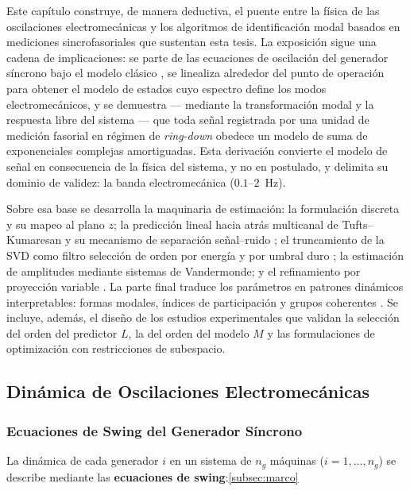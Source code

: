 Este capítulo construye, de manera deductiva, el puente entre la física de
las oscilaciones electromecánicas y los algoritmos de identificación modal
basados en mediciones sincrofasoriales que sustentan esta tesis. La
exposición sigue una cadena de implicaciones: se parte de las ecuaciones de
oscilación del generador síncrono bajo el modelo clásico \cite{kundur1994},
se linealiza alrededor del punto de operación para obtener el modelo de
estados cuyo espectro define los modos electromecánicos, y se demuestra ---
mediante la transformación modal y la respuesta libre del sistema ---  que
toda señal registrada por una unidad de medición fasorial en régimen de
\emph{ring-down} obedece un modelo de suma de exponenciales complejas
amortiguadas. Esta derivación convierte el modelo de señal en consecuencia
de la física del sistema, y no en postulado, y delimita su dominio de
validez: la banda electromecánica ($0.1$--$2$~Hz).

Sobre esa base se desarrolla la maquinaria de estimación: la formulación
discreta y su mapeo al plano $z$; la predicción lineal hacia atrás
multicanal de Tufts--Kumaresan y su mecanismo de separación señal--ruido
\cite{Tufts1982}; el truncamiento de la SVD como filtro selección de orden 
por energía y por umbral duro \cite{brunton2022,gavish2014}; la estimación de 
amplitudes mediante sistemas de Vandermonde; y el refinamiento por proyección 
variable \cite{askham2018}. La parte final traduce los parámetros en patrones
dinámicos interpretables: formas modales, índices de participación y grupos
coherentes \cite{jiang2021,li2018cwt,li2020era}. Se incluye, además, el
diseño de los estudios experimentales que validan la selección del orden
del predictor $L$, la del orden del modelo $M$ y las formulaciones de
optimización con restricciones de subespacio.



\subsection{Dinámica de Oscilaciones Electromecánicas}

\subsubsection{Ecuaciones de Swing del Generador Síncrono}

La dinámica de cada generador $i$ en un sistema de $n_g$ máquinas ($i=1,\ldots,n_g$) se 
describe mediante las \textbf{ecuaciones de swing}:\autoref{subsec:marco}

